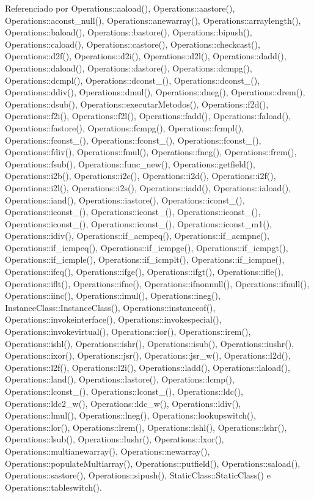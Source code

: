 Referenciado por Operations\+::aaload(), Operations\+::aastore(), Operations\+::aconst\+\_\+null(), Operations\+::anewarray(), Operations\+::arraylength(), Operations\+::baload(), Operations\+::bastore(), Operations\+::bipush(), Operations\+::caload(), Operations\+::castore(), Operations\+::checkcast(), Operations\+::d2f(), Operations\+::d2i(), Operations\+::d2l(), Operations\+::dadd(), Operations\+::daload(), Operations\+::dastore(), Operations\+::dcmpg(), Operations\+::dcmpl(), Operations\+::dconst\+\_(), Operations\+::dconst\+\_(), Operations\+::ddiv(), Operations\+::dmul(), Operations\+::dneg(), Operations\+::drem(), Operations\+::dsub(), Operations\+::executar\+Metodos(), Operations\+::f2d(), Operations\+::f2i(), Operations\+::f2l(), Operations\+::fadd(), Operations\+::faload(), Operations\+::fastore(), Operations\+::fcmpg(), Operations\+::fcmpl(), Operations\+::fconst\+\_(), Operations\+::fconst\+\_(), Operations\+::fconst\+\_(), Operations\+::fdiv(), Operations\+::fmul(), Operations\+::fneg(), Operations\+::frem(), Operations\+::fsub(), Operations\+::func\+\_\+new(), Operations\+::getfield(), Operations\+::i2b(), Operations\+::i2c(), Operations\+::i2d(), Operations\+::i2f(), Operations\+::i2l(), Operations\+::i2s(), Operations\+::iadd(), Operations\+::iaload(), Operations\+::iand(), Operations\+::iastore(), Operations\+::iconst\+\_(), Operations\+::iconst\+\_(), Operations\+::iconst\+\_(), Operations\+::iconst\+\_(), Operations\+::iconst\+\_(), Operations\+::iconst\+\_(), Operations\+::iconst\+\_\+m1(), Operations\+::idiv(), Operations\+::if\+\_\+acmpeq(), Operations\+::if\+\_\+acmpne(), Operations\+::if\+\_\+icmpeq(), Operations\+::if\+\_\+icmpge(), Operations\+::if\+\_\+icmpgt(), Operations\+::if\+\_\+icmple(), Operations\+::if\+\_\+icmplt(), Operations\+::if\+\_\+icmpne(), Operations\+::ifeq(), Operations\+::ifge(), Operations\+::ifgt(), Operations\+::ifle(), Operations\+::iflt(), Operations\+::ifne(), Operations\+::ifnonnull(), Operations\+::ifnull(), Operations\+::iinc(), Operations\+::imul(), Operations\+::ineg(), Instance\+Class\+::\+Instance\+Class(), Operations\+::instanceof(), Operations\+::invokeinterface(), Operations\+::invokespecial(), Operations\+::invokevirtual(), Operations\+::ior(), Operations\+::irem(), Operations\+::ishl(), Operations\+::ishr(), Operations\+::isub(), Operations\+::iushr(), Operations\+::ixor(), Operations\+::jsr(), Operations\+::jsr\+\_\+w(), Operations\+::l2d(), Operations\+::l2f(), Operations\+::l2i(), Operations\+::ladd(), Operations\+::laload(), Operations\+::land(), Operations\+::lastore(), Operations\+::lcmp(), Operations\+::lconst\+\_(), Operations\+::lconst\+\_(), Operations\+::ldc(), Operations\+::ldc2\+\_\+w(), Operations\+::ldc\+\_\+w(), Operations\+::ldiv(), Operations\+::lmul(), Operations\+::lneg(), Operations\+::lookupswitch(), Operations\+::lor(), Operations\+::lrem(), Operations\+::lshl(), Operations\+::lshr(), Operations\+::lsub(), Operations\+::lushr(), Operations\+::lxor(), Operations\+::multianewarray(), Operations\+::newarray(), Operations\+::populate\+Multiarray(), Operations\+::putfield(), Operations\+::saload(), Operations\+::sastore(), Operations\+::sipush(), Static\+Class\+::\+Static\+Class() e Operations\+::tableswitch().

